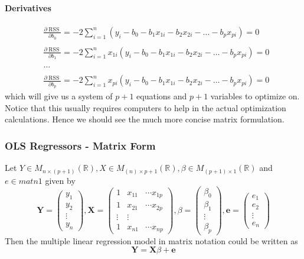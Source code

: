 \documentclass[11pt]{article}
\newcommand{\R}{\mathbb{R}}
\newcommand{\mat}[2]{M_{#1 \times #2}(\R)}
\begin{document}
\paragraph{Derivatives}
\begin{equation*}
    \begin{matrix}
        &\frac{\partial \operatorname{RSS}}{\partial b_{0}}=-2 \sum_{i=1}^{n}\left(y_{i}-b_{0}-b_{1} x_{1 i}-b_{2} x_{2 i}-\ldots-b_{p} x_{p i}\right)=0 \quad \,\,\\ \\
        &\frac{\partial \operatorname{RSS}}{\partial b_{1}}=-2 \sum_{i=1}^{n} x_{1 i}\left(y_{i}-b_{0}-b_{1} x_{1 i}-b_{2} x_{2 i}-\ldots-b_{p} x_{p i}\right)=0\\ \\
        & \dots \\ \\
        &\frac{\partial \operatorname{RSS}}{\partial b_{p}}=-2 \sum_{i=1}^{n} x_{p i}\left(y_{i}-b_{0}-b_{1} x_{1 i}-b_{2} x_{2 i}-\ldots-b_{p} x_{p i}\right)=0
    \end{matrix}
\end{equation*}
which will give us a system of $p+1$ equations and $p+1$ variables to optimize on. Notice that this usually requires computers to help in the actual optimization calculations. Hence we should see the much more concise matrix formulation.

\subsubsection{OLS Regressors - Matrix Form}
Let $Y \in \mat{n}{(p+1)}, X\in \mat{(n)}{p+1}, \beta\in \mat{(p+1)}{1}$ and $e\in mat{n}{1}$ given by
\begin{equation*}
    \mathbf{Y}=\left(\begin{array}{c}{y_{1}} \\ {y_{2}} \\ {\vdots} \\ {y_{n}}\end{array}\right), \mathbf{X}=\left(\begin{array}{ccc}{1} & {x_{11}} & {\cdots x_{1 p}} \\ {1} & {x_{21}} & {\cdots x_{2 p}} \\ {\vdots} & {\vdots} & {} \\ {1} & {x_{n 1}} & {\cdots x_{n p}}\end{array}\right), \beta=\left(\begin{array}{c}{\beta_{0}} \\ {\beta_{1}} \\ {\vdots} \\ {\beta_{p}}\end{array}\right), \mathbf{e}=\left(\begin{array}{c}{e_{1}} \\ {e_{2}} \\ {\vdots} \\ {e_{n}}\end{array}\right)
\end{equation*}
Then the multiple linear regression model in matrix notation could be written as
\begin{equation*}
    \mathbf{Y}=\mathbf{X} \beta+\mathbf{e}
\end{equation*}
\end{document}
